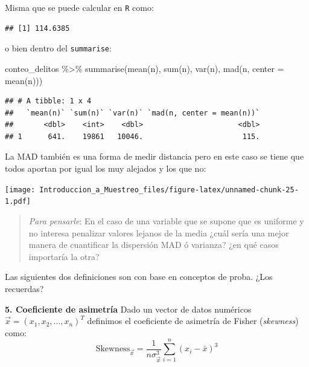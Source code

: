 \documentclass[
]{book}
\newenvironment{Shaded}{\begin{snugshade}}{\end{snugshade}}
\newcommand{\AttributeTok}[1]{\textcolor[rgb]{0.77,0.63,0.00}{#1}}
\newcommand{\FunctionTok}[1]{\textcolor[rgb]{0.00,0.00,0.00}{#1}}
\newcommand{\NormalTok}[1]{#1}
\newcommand{\SpecialCharTok}[1]{\textcolor[rgb]{0.00,0.00,0.00}{#1}}
\begin{document}
Misma que se puede calcular en \texttt{R} como:

\begin{Shaded}
\end{Shaded}

\begin{verbatim}
## [1] 114.6385
\end{verbatim}

o bien dentro del \texttt{summarise}:

\begin{Shaded}
\begin{Highlighting}[]
\NormalTok{conteo\_delitos }\SpecialCharTok{\%\textgreater{}\%} \FunctionTok{summarise}\NormalTok{(}\FunctionTok{mean}\NormalTok{(n), }\FunctionTok{sum}\NormalTok{(n), }\FunctionTok{var}\NormalTok{(n), }
                             \FunctionTok{mad}\NormalTok{(n, }\AttributeTok{center =} \FunctionTok{mean}\NormalTok{(n)))}
\end{Highlighting}
\end{Shaded}

\begin{verbatim}
## # A tibble: 1 x 4
##   `mean(n)` `sum(n)` `var(n)` `mad(n, center = mean(n))`
##       <dbl>    <int>    <dbl>                      <dbl>
## 1      641.    19861   10046.                       115.
\end{verbatim}

La MAD también es una forma de medir distancia pero en este caso se tiene que todos aportan por igual los muy alejados y los que no:

\texttt{[image: Introduccion\_a\_Muestreo\_files/figure-latex/unnamed-chunk-25-1.pdf]}

\begin{quote}
\emph{Para pensarle}: En el caso de una variable que se supone que es uniforme y no interesa penalizar valores lejanos de la media ¿cuál sería una mejor manera de cuantificar la dispersión MAD ó varianza? ¿en qué casos importaría la otra?
\end{quote}

Las siguientes dos definiciones son con base en conceptos de proba. ¿Los recuerdas?

\textbf{5. Coeficiente de asimetría} Dado un vector de datos numéricos \(\vec{x} = (x_1, x_2, \dots, x_n)^T\) definimos el coeficiente de asimetría de Fisher (\emph{skewness}) como:
\[
\text{Skewness}_{\vec{x}} = \frac{1}{n \sigma^3_{\vec{x}} } \sum\limits_{i = 1}^{n} (x_i - \bar{x})^3
\]
\end{document}
